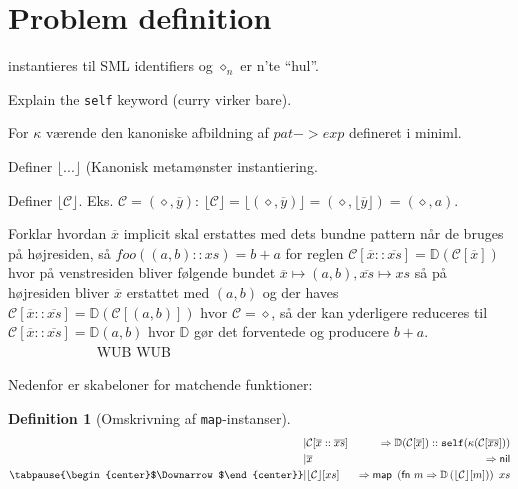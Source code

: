 \documentclass[oneside]{memoir}
\newcommand{\floor}[1]{\ensuremath{\lfloor #1 \rfloor}}
\theoremstyle{definition}
\newtheorem{definition}{Definition}
\begin{document}
\section{Problem definition}


instantieres til SML identifiers og $\diamond_n$ er n'te ``hul''.



Explain the \texttt{self} keyword (curry virker bare).

For $\kappa$ værende den kanoniske afbildning af $pat -> exp$ defineret i
miniml.

Definer $\floor{...}$ (Kanonisk metamønster instantiering.

Definer $\floor{\mathcal{C}}$. Eks. $\mathcal{C} = (\diamond, \overline{y})$:
$\floor{\mathcal{C}} = \floor{(\diamond, \overline{y})} = (\diamond,
\floor{\overline{y}}) = (\diamond, a)$.

Forklar hvordan $\overline{x}$ implicit skal erstattes med dets bundne pattern når
de bruges på højresiden, så $foo((a,b)::xs) = b+a$ for reglen $\mathcal{C}
[\overline{x}::\overline{xs}] = \mathbb{D}(\mathcal{C}[\overline{x}])$ hvor på venstresiden
bliver følgende bundet $\overline{x} \mapsto (a,b), \overline{xs} \mapsto xs$ så
på højresiden bliver $\overline{x}$ erstattet med $(a,b)$ og der haves $\mathcal{C}
[\overline{x}::\overline{xs}] = \mathbb{D}(\mathcal{C}[(a,b)])$ hvor
$\mathcal{C} = \diamond$, så der kan yderligere reduceres til $\mathcal{C}
[\overline{x}::\overline{xs}] = \mathbb{D}(a,b)$ hvor $\mathbb{D}$ gør det
forventede og producere $b+a$. ~~~~~~~~~~~~ WUB WUB

Nedenfor er skabeloner for matchende funktioner:

\begin{definition}[Omskrivning af \texttt{map}-instanser] \ \\

  \begin{eqnarray*}[rqrl]
    | & \mathcal{C}  [\overline{x} :: \overline{xs}] &  => \mathbb{D}
    (\mathcal{C}[ \overline{x}]) :: \mathtt{self}(\kappa \mathsf{(} \mathcal{C} 
    [ \overline{xs} ] \mathsf{) )} \\
    | & \overline{x} & => \mathsf{nil} \\
   \tabpause{\begin{center}$\Downarrow$\end{center}}  
    | & \floor{\mathcal{C}} [ xs ] & => \textsf{map } \left( \textsf{fn } m =>
      \mathbb{D}\left( \floor{\mathcal{C}} [ m ] \right) \right) \ xs
  \end{eqnarray*}
\end{definition}
\end{document}
